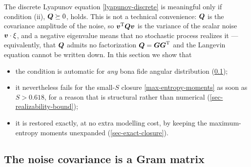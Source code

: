 \documentclass[a5paper]{article}
\begin{document}
The discrete Lyapunov equation \eqref{lyapunov-discrete} is meaningful only if condition (ii), $\boldsymbol Q \succeq 0$, holds. This is not a technical convenience: $\boldsymbol Q$ is the covariance amplitude of the noise, so $\boldsymbol v^{\mathrm{T}} \boldsymbol Q \boldsymbol v$ is the variance of the scalar noise $\boldsymbol v \cdot \mathbf{\xi}$, and a negative eigenvalue means that no stochastic process realizes it --- equivalently, that $\boldsymbol Q$ admits no factorization $\boldsymbol Q = \boldsymbol G \boldsymbol G^{\mathrm{T}}$ and the Langevin equation cannot be written down. In this section we show that
\begin{itemize}
    \item the condition is automatic for \emph{any} bona fide angular distribution (\cref{sec-noise-gram});
    \item it nevertheless fails for the small-$S$ closure \eqref{max-entropy-moments} as soon as $S > 0.618$, for a reason that is structural rather than numerical (\cref{sec-realizability-bound});
    \item it is restored exactly, at no extra modelling cost, by keeping the maximum-entropy moments unexpanded (\cref{sec-exact-closure}).
\end{itemize}

\subsection{The noise covariance is a Gram matrix}
\label{sec-noise-gram}
\end{document}
